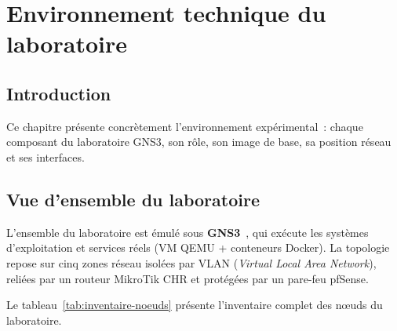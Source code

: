 \chapter{Environnement technique du laboratoire}
\label{chap:environnement}

\section{Introduction}

Ce chapitre présente concrètement l'environnement expérimental~: chaque composant du laboratoire GNS3, son rôle, son image de base, sa position réseau et ses interfaces.

\section{Vue d'ensemble du laboratoire}
\label{sec:env-vue}

L'ensemble du laboratoire est émulé sous \textbf{GNS3}~\cite{gns3_docs}, qui exécute les systèmes d'exploitation et services réels (VM QEMU + conteneurs Docker). La topologie repose sur cinq zones réseau isolées par VLAN (\emph{Virtual Local Area Network}), reliées par un routeur MikroTik CHR et protégées par un pare-feu pfSense.

Le tableau~\ref{tab:inventaire-noeuds} présente l'inventaire complet des n\oe{}uds du laboratoire.

